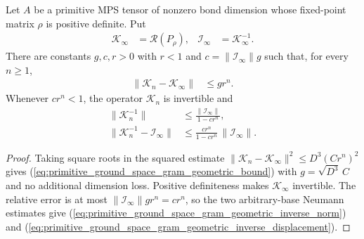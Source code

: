 \begin{lemma}
    \label{thm:primitive_ground_space_gram_geometric_inverse_bounds}
    \leanok
    Let $A$ be a primitive MPS tensor of nonzero bond dimension whose
    fixed-point matrix $\rho$ is positive definite.  Put
    \begin{align}
        \mathcal K_\infty & =\mathscr R(P_\rho),     &
        \mathcal I_\infty & =\mathcal K_\infty^{-1}.
    \end{align}
    There are constants $g,c,r>0$ with $r<1$ and
    $c=\lVert\mathcal I_\infty\rVert g$ such that, for every $n\geq1$,
    \begin{align}
        \lVert\mathcal K_n-\mathcal K_\infty\rVert
         & \leq gr^n.
        \label{eq:primitive_ground_space_gram_geometric_bound}
    \end{align}
    Whenever $cr^n<1$, the operator $\mathcal K_n$ is invertible and
    \begin{align}
        \lVert\mathcal K_n^{-1}\rVert
         & \leq\frac{\lVert\mathcal I_\infty\rVert}{1-cr^n},
        \label{eq:primitive_ground_space_gram_geometric_inverse_norm} \\
        \lVert\mathcal K_n^{-1}-\mathcal I_\infty\rVert
         & \leq\frac{cr^n}{1-cr^n}\,
        \lVert\mathcal I_\infty\rVert.
        \label{eq:primitive_ground_space_gram_geometric_inverse_displacement}
    \end{align}
\end{lemma}

\begin{proof}
    \leanok
    Taking square roots in the squared estimate
    $\lVert\mathcal K_n-\mathcal K_\infty\rVert^2
        \leq D^3(Cr^n)^2$
    gives (\ref{eq:primitive_ground_space_gram_geometric_bound}) with
    $g=\sqrt{D^3}\,C$ and no additional dimension loss.  Positive
    definiteness makes $\mathcal K_\infty$ invertible.  The relative error is
    at most $\lVert\mathcal I_\infty\rVert gr^n=cr^n$, so the two
    arbitrary-base Neumann estimates give
    (\ref{eq:primitive_ground_space_gram_geometric_inverse_norm}) and
    (\ref{eq:primitive_ground_space_gram_geometric_inverse_displacement}).
\end{proof}

